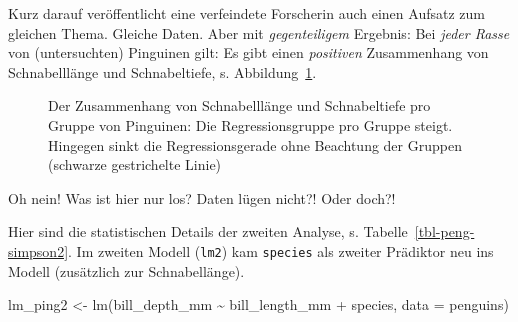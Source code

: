 \documentclass[
  letterpaper,
  twoside,
  open=any]{scrbook}
\newenvironment{Shaded}{\begin{snugshade}}{\end{snugshade}}
\newcommand{\AttributeTok}[1]{\textcolor[rgb]{0.40,0.45,0.13}{#1}}
\newcommand{\FunctionTok}[1]{\textcolor[rgb]{0.28,0.35,0.67}{#1}}
\newcommand{\NormalTok}[1]{\textcolor[rgb]{0.00,0.23,0.31}{#1}}
\newcommand{\OtherTok}[1]{\textcolor[rgb]{0.00,0.23,0.31}{#1}}
\newcommand{\SpecialCharTok}[1]{\textcolor[rgb]{0.37,0.37,0.37}{#1}}
\theoremstyle{definition}
\theoremstyle{definition}
\theoremstyle{definition}
\theoremstyle{remark}
\begin{document}
Kurz darauf veröffentlicht eine verfeindete Forscherin auch einen
Aufsatz zum gleichen Thema. Gleiche Daten. Aber mit \emph{gegenteiligem}
Ergebnis: Bei \emph{jeder Rasse} von (untersuchten) Pinguinen gilt: Es
gibt einen \emph{positiven} Zusammenhang von Schnabelllänge und
Schnabeltiefe, s. Abbildung~\ref{fig-penguins-groups}.

\begin{figure}


\caption{\label{fig-penguins-groups}Der Zusammenhang von Schnabelllänge
und Schnabeltiefe pro Gruppe von Pinguinen: Die Regressionsgruppe pro
Gruppe steigt. Hingegen sinkt die Regressionsgerade ohne Beachtung der
Gruppen (schwarze gestrichelte Linie)}

\end{figure}%

Oh nein! Was ist hier nur los? Daten lügen nicht?! Oder doch?!

Hier sind die statistischen Details der zweiten Analyse, s.
Tabelle~\ref{tbl-peng-simpson2}. Im zweiten Modell (\texttt{lm2}) kam
\texttt{species} als zweiter Prädiktor neu ins Modell (zusätzlich zur
Schnabellänge).

\begin{Shaded}
\begin{Highlighting}[]
\NormalTok{lm\_ping2 }\OtherTok{\textless{}{-}} \FunctionTok{lm}\NormalTok{(bill\_depth\_mm }\SpecialCharTok{\textasciitilde{}}\NormalTok{ bill\_length\_mm }\SpecialCharTok{+}\NormalTok{ species, }\AttributeTok{data =}\NormalTok{ penguins)}
\end{Highlighting}
\end{Shaded}
\end{document}
